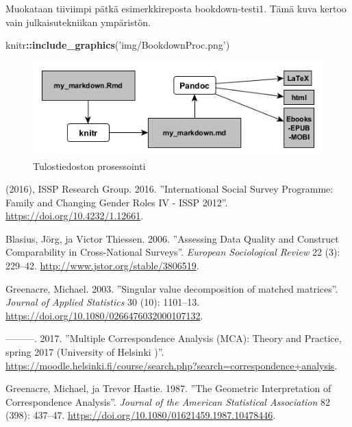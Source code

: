 \documentclass[
  finnish,
]{book}
\newenvironment{Shaded}{\begin{snugshade}}{\end{snugshade}}
\newcommand{\KeywordTok}[1]{\textcolor[rgb]{0.13,0.29,0.53}{\textbf{#1}}}
\newcommand{\NormalTok}[1]{#1}
\newcommand{\OperatorTok}[1]{\textcolor[rgb]{0.81,0.36,0.00}{\textbf{#1}}}
\newcommand{\StringTok}[1]{\textcolor[rgb]{0.31,0.60,0.02}{#1}}
\begin{document}
Muokataan tiiviimpi pätkä esimerkkireposta bookdown-testi1. Tämä kuva
kertoo vain julkaisutekniikan ympäristön.

\begin{Shaded}
\begin{Highlighting}[]
\NormalTok{knitr}\OperatorTok{::}\KeywordTok{include_graphics}\NormalTok{(}\StringTok{'img/BookdownProc.png'}\NormalTok{)}
\end{Highlighting}
\end{Shaded}

\begin{figure}

{\centering \includegraphics[width=0.6\linewidth]{img/BookdownProc} 

}

\caption{Tulostiedoston prosessointi}\label{fig:L3bdprocess1}
\end{figure}

\hypertarget{refs}{}
\leavevmode\hypertarget{ref-RefWorks:doc:5b6c7b0de4b0fd36f5bb4c2a}{}%
(2016), ISSP Research Group. 2016. ''International Social Survey
Programme: Family and Changing Gender Roles IV - ISSP 2012''.
\url{https://doi.org/10.4232/1.12661}.

\leavevmode\hypertarget{ref-RefWorks:doc:5b15542ee4b0e2616bc42dca}{}%
Blasius, Jörg, ja Victor Thiessen. 2006. ''Assessing Data Quality and
Construct Comparability in Cross-National Surveys''. \emph{European
Sociological Review} 22 (3): 229--42.
\url{http://www.jstor.org/stable/3806519}.

\leavevmode\hypertarget{ref-RefWorks:doc:5b6f159ce4b0bc0f31734b76}{}%
Greenacre, Michael. 2003. ''Singular value decomposition of matched
matrices''. \emph{Journal of Applied Statistics} 30 (10): 1101--13.
\url{https://doi.org/10.1080/0266476032000107132}.

\leavevmode\hypertarget{ref-RefWorks:doc:5b6ef091e4b0984fd9b8c0ca}{}%
---------. 2017. ''Multiple Correspondence Analysis (MCA): Theory and
Practice, spring 2017 (University of Helsinki )''.
\url{https://moodle.helsinki.fi/course/search.php?search=correspondence+analysis}.

\leavevmode\hypertarget{ref-RefWorks:doc:5a857a44e4b0ed2d44664d84}{}%
Greenacre, Michael, ja Trevor Hastie. 1987. ''The Geometric
Interpretation of Correspondence Analysis''. \emph{Journal of the
American Statistical Association} 82 (398): 437--47.
\url{https://doi.org/10.1080/01621459.1987.10478446}.
\end{document}
